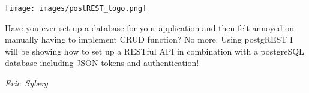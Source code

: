 \hfill\texttt{[image: images/postREST\_logo.png]}

Have you ever set up a database for your application and then felt annoyed on manually having to implement CRUD function?
No more. Using postgREST I will be showing how to set up a RESTful API in combination with a postgreSQL database including JSON tokens and authentication!

\hfill\textit{Eric~Syberg}
